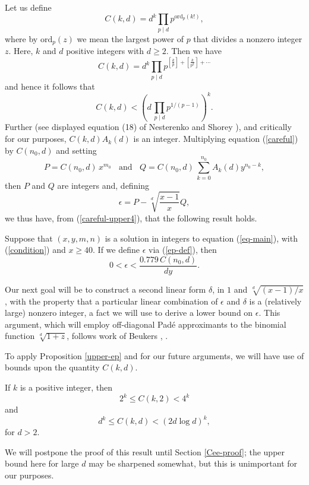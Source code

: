 Let us define
 $$
 C(k,d) = d^k \prod_{p \mid d} p^{\mbox{ord}_p (k!)},
 $$
 where by $\mbox{ord}_p(z)$ we mean the largest power of $p$ that divides a nonzero integer $z$. Here,
 $k$  and $d$ positive integers with $d \geq 2$. Then we have
$$
C(k,d) =  d^k \prod_{p \mid d} p^{\left[ \frac{k}{p} \right] + \left[ \frac{k}{p^2} \right] + \cdots}
$$
and hence it follows that
\begin{equation} \label{C-upper}
C(k,d) < \left( d \,  \prod_{p \mid d} p^{1/(p-1)} \right)^k.
\end{equation}
Further (see displayed equation (18) of Nesterenko and Shorey \cite{NeSh}), and critically for our purposes, $C(k,d) A_k (d)$ is an integer. Multiplying equation (\ref{careful}) by $C(n_0,d)$ and setting 
\begin{equation} \label{P-Q-def}
 P = C(n_0,d) \,  x^{m_0} \; \; \mbox{ and } \; \; Q = C(n_0,d) \,  \sum_{k = 0}^{n_0} A_k (d) y^{n_0-k},
\end{equation}
 then $P$ and $Q$ are integers  and, defining
\begin{equation} \label{ep-def}
\epsilon = P - \sqrt[d]{\frac{x-1}{x}} Q,
\end{equation}
 we thus have, from (\ref{careful-upper4}), that the following result holds.
 \begin{proposition} \label{upper-ep}
 Suppose that $(x,y,m,n)$ is a solution in integers to equation (\ref{eq-main}), with (\ref{condition}) and $x \geq 40$. If we define $\epsilon$ via (\ref{ep-def}),  then
\begin{equation} \label{start}
0 < \epsilon < \frac{0.779 \, C(n_0,d)}{dy}.
\end{equation}
 \end{proposition}
 
Our next goal will be to construct a second linear form $\delta$, in $1$ and $\sqrt[d]{(x-1)/x}$, with the property that a particular linear combination of $\epsilon$ and $\delta$ is a (relatively large) nonzero integer, a fact we will use to derive a lower bound on $\epsilon$. This argument, which will employ off-diagonal Pad\'e approximants to the binomial function $\sqrt[d]{1+z}$, follows work of Beukers \cite{Beu1}, \cite{Beu2}.

To apply Proposition \ref{upper-ep} and for our future arguments, we will have use of bounds upon the quantity $C(k,d)$. 
 \begin{proposition} \label{Cee}
If $k$ is a positive integer, then
$$
2^k \leq C(k,2) < 4^k
$$
and
$$
d^k \leq C(k,d) < (2 d \log d)^k,
$$
for $d > 2$.
\end{proposition}
We will postpone the proof of this result until Section \ref{Cee-proof}; the upper bound here for large $d$ may be sharpened somewhat, but this is unimportant for our purposes.

